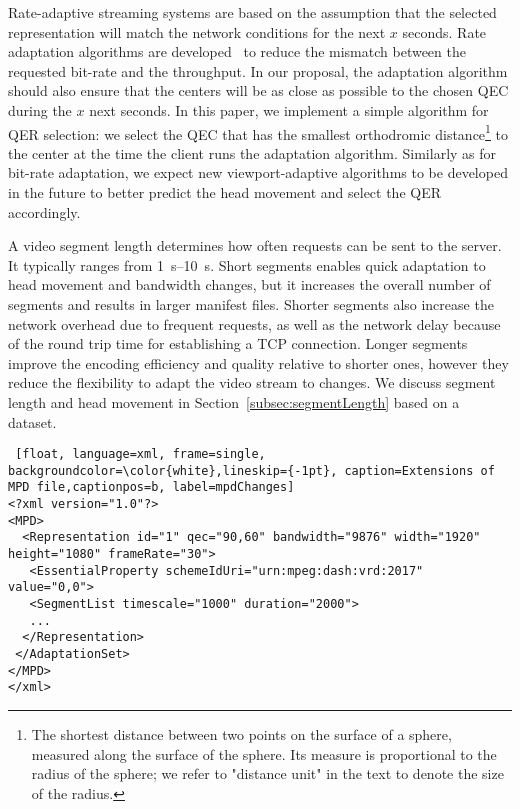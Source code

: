 Rate-adaptive streaming systems are based on the assumption that
the selected representation will match the network
conditions for the next $x$ seconds. Rate adaptation algorithms
are
developed~\cite{tian,probe_li_2014,miller,zou,liu} to reduce the mismatch between the
requested bit-rate and the throughput. In our proposal, the adaptation algorithm should also ensure
that the \FoV{} centers will be as close as possible to the chosen \ac{QEC} during
the $x$ next seconds.
In this paper, we implement
a simple algorithm for \ac{QER} selection: we select the \ac{QEC} that
has the smallest orthodromic distance\footnote{The shortest distance
between two points on the surface of a sphere, measured along the
surface of the sphere. Its measure is proportional to the radius
of the sphere; we refer to "distance unit" in the text to denote the
size of the radius.} to the \FoV{} center at the time the client runs
the adaptation algorithm. Similarly as for bit-rate adaptation, we
expect new viewport-adaptive algorithms to be developed in
the future to better predict the head movement and select the
\ac{QER} accordingly.



A video segment length determines how
often requests can be sent to the server. It typically ranges from
\SIrange{1}{10}{\second}. Short segments enables quick
adaptation to head movement and bandwidth changes, but it increases
the overall number of segments and results in larger manifest files.
Shorter segments also increase the network overhead due to
frequent requests, as well as the network delay because of the round
trip time for establishing a TCP connection.
Longer segments improve the encoding efficiency and quality relative to
shorter ones, however they reduce the flexibility to adapt the video
stream to changes. We discuss segment length and head movement in
Section~\ref{subsec:segmentLength} based on a dataset.



\begin{lstlisting} [float, language=xml, frame=single, backgroundcolor=\color{white},lineskip={-1pt}, caption=Extensions of MPD file,captionpos=b, label=mpdChanges]
<?xml version="1.0"?>
<MPD>
  <Representation id="1" qec="90,60" bandwidth="9876" width="1920" height="1080" frameRate="30">
   <EssentialProperty schemeIdUri="urn:mpeg:dash:vrd:2017" value="0,0">
   <SegmentList timescale="1000" duration="2000">
   ...
  </Representation>
 </AdaptationSet>
</MPD>
</xml>
\end{lstlisting}

